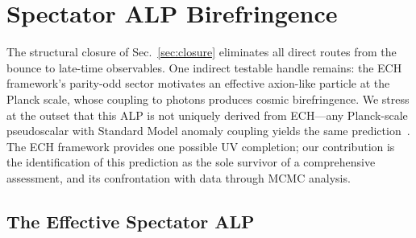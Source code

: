 
\section{Spectator ALP Birefringence}
\label{sec:alp}

The structural closure of Sec.~\ref{sec:closure} eliminates all direct routes
from the bounce to late-time observables.  One indirect testable handle
remains: the ECH framework's parity-odd sector motivates an effective
axion-like particle at the Planck scale, whose coupling to photons produces
cosmic birefringence.  We stress at the outset that this ALP is not uniquely
derived from ECH---any Planck-scale pseudoscalar with Standard Model anomaly
coupling yields the same prediction~\cite{Fujita2021,Nakagawa2025}.  The ECH
framework provides one possible UV completion; our contribution is the
identification of this prediction as the sole survivor of a comprehensive
assessment, and its confrontation with data through MCMC analysis.


\subsection{The Effective Spectator ALP}
\label{sec:alp_model}

